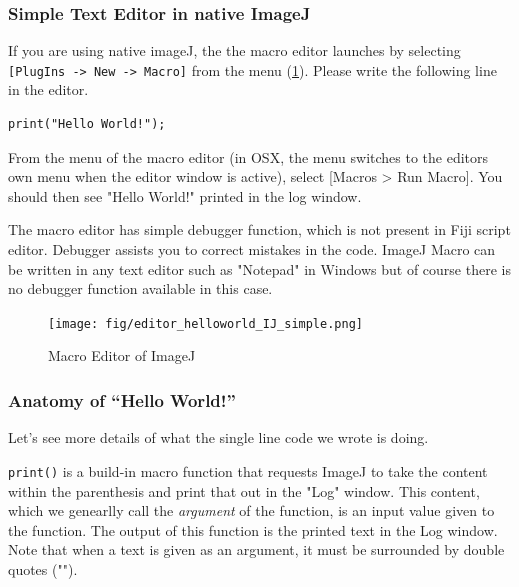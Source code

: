 \documentclass[11pt,a4paper,oneside]{report}
\newcommand{\ijmenu}[1]{\texttt{\small#1}}
\newcommand{\ilcom}[1]{\texttt{\small#1}}
\begin{document}
\subsubsection{Simple Text Editor in native ImageJ}
\label{part:nativeeditor}

If you are using native imageJ, the the macro editor launches by selecting \ijmenu{[PlugIns -> New -> Macro]} from the menu (\ref{fig_MacroEditor}). 
Please write the following line in the editor. 
\begin{lstlisting}[numbers=none]
print("Hello World!");
\end{lstlisting}
From the menu of the macro editor (in OSX, the menu switches to the editors own menu when the editor window is active), select [Macros > Run Macro]. You should then see "Hello World!" printed in the log window. 

The macro editor has simple debugger function, which is not present in Fiji script editor. Debugger assists you to correct mistakes in the code. ImageJ Macro can be written in any text editor such as "Notepad" in Windows but of course there is no debugger function available in this case.

\begin{figure}[htbp]
\begin{center}
\texttt{[image: fig/editor\_helloworld\_IJ\_simple.png]}
\caption{Macro Editor of ImageJ} \label{fig_MacroEditor}
\end{center}
\end{figure}


\subsubsection{Anatomy of ``Hello World!''}

Let's see more details of what the single line code we wrote is doing.

\ilcom{print()} is a build-in macro function that requests ImageJ to take the content within the parenthesis and print that out in the "Log" window. This content, which we genearlly call the \textit{argument} of the function, is an input value given to the function. The output of this function is the printed text in the Log window. Note that when a text is given as an argument, it must be surrounded by double quotes ("").
 
\end{document}
